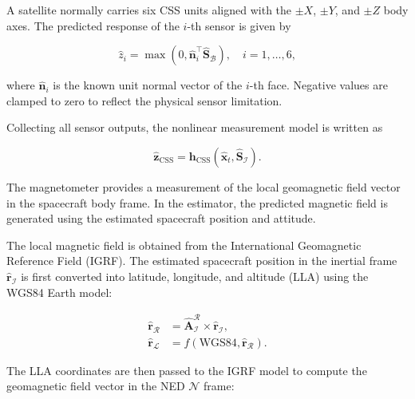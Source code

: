 \noindent 
A satellite normally carries six CSS units aligned with the $\pm X$, $\pm Y$, and $\pm Z$ body axes. The predicted response of the $i$-th sensor is given by

\begin{equation}
    \hat{z}_i = \max\left(0, \hat{\mathbf{n}}_i^\top \hat{\mathbf{S}}_\mathcal{B} \right), \quad i = 1,\dots,6,
\end{equation}

\noindent
where $\hat{\mathbf{n}}_i$ is the known unit normal vector of the $i$-th face. Negative values are clamped to zero to reflect the physical sensor limitation.
\vspace{0.5cm}

\noindent Collecting all sensor outputs, the nonlinear measurement model is written as

\begin{equation}
    \mathbf{\hat{z}}_{\text{CSS}} = \mathbf{h}_{\text{CSS}}(\mathbf{\hat{x}}_t,\mathbf{\hat{S}}_\mathcal{I}).
\end{equation}

\label{sec:MAGMeasModel}

The magnetometer provides a measurement of the local geomagnetic field vector in the spacecraft body frame. 
In the estimator, the predicted magnetic field is generated using the estimated spacecraft position and attitude.
\vspace{0.5cm}

\noindent The local magnetic field is obtained from the International Geomagnetic Reference Field (IGRF). 
The estimated spacecraft position in the inertial frame $\hat{\mathbf{r}}_\mathcal{I}$ is first converted into 
latitude, longitude, and altitude (LLA) using the WGS84 Earth model:

\begin{equation}
    \begin{split}
    \hat{\mathbf{r}}_\mathcal{R} &= \mathbf{\hat{A}}_\mathcal{I}^\mathcal{R} \times \hat{\mathbf{r}}_\mathcal{I}, \\
    \hat{\mathbf{r}}_\mathcal{L} &= f(\text{WGS84}, \hat{\mathbf{r}}_\mathcal{R}).
    \end{split}
\end{equation}

\noindent The LLA coordinates are then passed to the IGRF model to compute the geomagnetic field vector in the NED $\mathcal{N}$ frame:

